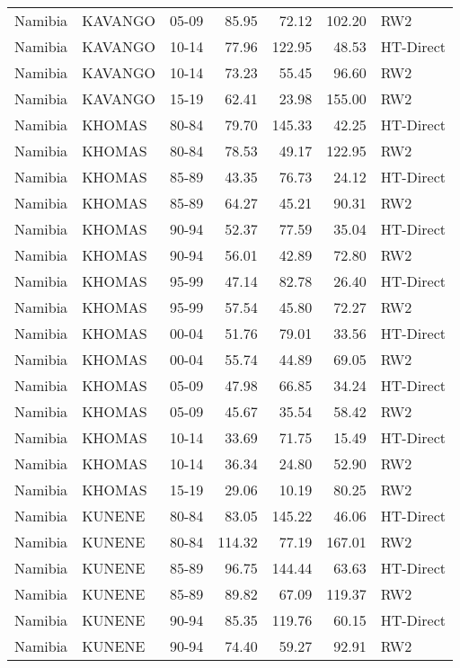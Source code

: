 \begin{longtable}{lllrrrl}
  Namibia & KAVANGO & 05-09 & 85.95 & 72.12 & 102.20 & RW2 \\ 
  Namibia & KAVANGO & 10-14 & 77.96 & 122.95 & 48.53 & HT-Direct \\ 
  Namibia & KAVANGO & 10-14 & 73.23 & 55.45 & 96.60 & RW2 \\ 
  Namibia & KAVANGO & 15-19 & 62.41 & 23.98 & 155.00 & RW2 \\ 
  Namibia & KHOMAS & 80-84 & 79.70 & 145.33 & 42.25 & HT-Direct \\ 
  Namibia & KHOMAS & 80-84 & 78.53 & 49.17 & 122.95 & RW2 \\ 
  Namibia & KHOMAS & 85-89 & 43.35 & 76.73 & 24.12 & HT-Direct \\ 
  Namibia & KHOMAS & 85-89 & 64.27 & 45.21 & 90.31 & RW2 \\ 
  Namibia & KHOMAS & 90-94 & 52.37 & 77.59 & 35.04 & HT-Direct \\ 
  Namibia & KHOMAS & 90-94 & 56.01 & 42.89 & 72.80 & RW2 \\ 
  Namibia & KHOMAS & 95-99 & 47.14 & 82.78 & 26.40 & HT-Direct \\ 
  Namibia & KHOMAS & 95-99 & 57.54 & 45.80 & 72.27 & RW2 \\ 
  Namibia & KHOMAS & 00-04 & 51.76 & 79.01 & 33.56 & HT-Direct \\ 
  Namibia & KHOMAS & 00-04 & 55.74 & 44.89 & 69.05 & RW2 \\ 
  Namibia & KHOMAS & 05-09 & 47.98 & 66.85 & 34.24 & HT-Direct \\ 
  Namibia & KHOMAS & 05-09 & 45.67 & 35.54 & 58.42 & RW2 \\ 
  Namibia & KHOMAS & 10-14 & 33.69 & 71.75 & 15.49 & HT-Direct \\ 
  Namibia & KHOMAS & 10-14 & 36.34 & 24.80 & 52.90 & RW2 \\ 
  Namibia & KHOMAS & 15-19 & 29.06 & 10.19 & 80.25 & RW2 \\ 
  Namibia & KUNENE & 80-84 & 83.05 & 145.22 & 46.06 & HT-Direct \\ 
  Namibia & KUNENE & 80-84 & 114.32 & 77.19 & 167.01 & RW2 \\ 
  Namibia & KUNENE & 85-89 & 96.75 & 144.44 & 63.63 & HT-Direct \\ 
  Namibia & KUNENE & 85-89 & 89.82 & 67.09 & 119.37 & RW2 \\ 
  Namibia & KUNENE & 90-94 & 85.35 & 119.76 & 60.15 & HT-Direct \\ 
  Namibia & KUNENE & 90-94 & 74.40 & 59.27 & 92.91 & RW2 \\ 

\end{longtable}

